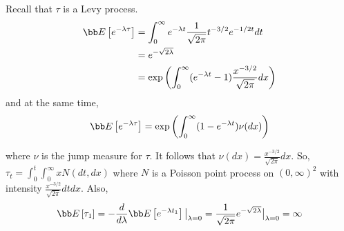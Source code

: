 \documentclass[../../../Master/AppliedStochastics.tex]{subfiles}
\begin{document}
Recall that $\tau$ is a Levy process.
$$
\begin{aligned}
\bb E \left[ e^{- \lambda \tau} \right] 
& = \int_{0}^{\infty} e^{- \lambda t} \frac{1}{\sqrt{2 \pi}} t^{-3/2} e^{-1/2t} 
dt \\	
& = e^{- \sqrt{2\lambda}} \\
& = \exp \left( \int_{0}^{\infty} (e^{-\lambda t } - 1) \frac{x^{-3/2}}{\sqrt{2 
\pi}} dx \right)
\end{aligned}
$$
and at the same time,
$$
\begin{aligned}
\bb E \left[ e^{-\lambda \tau} \right]
= \exp \left( \int_{0}^{\infty} (1 - e^{-\lambda t }) \nu(dx) \right)
\end{aligned}
$$

where $\nu$ is the jump measure for $\tau.$ It follows that 
$\nu(dx)=\frac{x^{-3/2}}{\sqrt{2 \pi}}dx.$
So,
$\tau_t = \int_{0}^{t} \int_{0}^{\infty} x N(dt, dx)$
where $N$ is a Poisson point process on $\left( 0 ,\infty \right)^2$ with 
intensity $\frac{x^{-3/2}}{\sqrt{2 \pi}}dtdx.$
Also,
$$
\bb E \left[ \tau_1 \right] 
= -\frac{d}{d\lambda} \bb E \left[ e^{-\lambda t_1} \right]\big|_{\lambda=0}
= \frac{1}{\sqrt{2 \pi}}e^{-\sqrt{2\lambda}}\big|_{\lambda=0}
= \infty
$$


%
\end{document}
